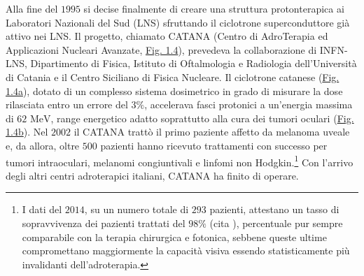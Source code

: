\documentclass[12pt,a4paper,twoside]{report}
\begin{document}
	Alla fine del $1995$ si decise finalmente di creare una struttura protonterapica ai Laboratori Nazionali del Sud (LNS) sfruttando il ciclotrone superconduttore già attivo nei LNS. Il progetto, chiamato CATANA (Centro di AdroTerapia ed Applicazioni Nucleari Avanzate, \hyperref[fig:catana]{Fig. 1.4}), prevedeva la collaborazione di INFN-LNS, Dipartimento di Fisica, Istituto di Oftalmologia e Radiologia dell'Università di Catania e il Centro Siciliano di Fisica Nucleare. Il ciclotrone catanese (\hyperref[fig:catana1]{Fig. 1.4a}), dotato di un complesso sistema dosimetrico in grado di misurare la dose rilasciata entro un errore del $3\%$, accelerava fasci protonici a un'energia massima di $62 \mbox{ MeV}$, range energetico adatto soprattutto alla cura dei tumori oculari (\hyperref[fig:catana2]{Fig. 1.4b}). Nel $2002$ il CATANA trattò il primo paziente affetto da melanoma uveale e, da allora, oltre $500$ pazienti hanno ricevuto trattamenti con successo per tumori intraoculari, melanomi congiuntivali e linfomi non Hodgkin.\footnote{I dati del $2014$, su un numero totale di $293$ pazienti, attestano un tasso di sopravvivenza dei pazienti trattati del $98\%$ (cita
	), percentuale pur sempre comparabile con la terapia chirurgica e fotonica, sebbene queste ultime compromettano maggiormente la capacità visiva essendo statisticamente più invalidanti dell'adroterapia.} Con l'arrivo degli altri centri adroterapici italiani, CATANA ha finito di operare.
\end{document}
